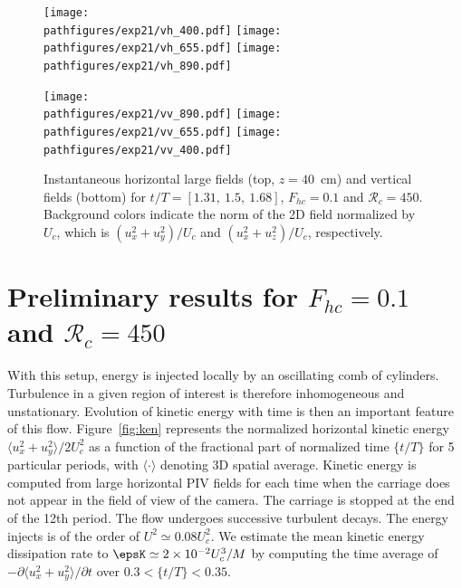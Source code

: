\begin{figure}[htb]
\centerline{
\texttt{[image: \\pathfigures/exp21/vh\_400.pdf]}
\texttt{[image: \\pathfigures/exp21/vh\_655.pdf]}
\texttt{[image: \\pathfigures/exp21/vh\_890.pdf]}}
\vspace{0mm}
\centerline{
\texttt{[image: \\pathfigures/exp21/vv\_890.pdf]}
\texttt{[image: \\pathfigures/exp21/vv\_655.pdf]}
\texttt{[image: \\pathfigures/exp21/vv\_400.pdf]}
}
\vspace{-2mm}
\caption{Instantaneous horizontal large fields (top, $z=40$~cm) and vertical
fields (bottom) for $t/T = [1.31,~1.5,~1.68]$, $F_{hc} = 0.1$ and
$\mathcal{R}_c=450$. Background colors indicate the norm of the 2D field
normalized by $U_c$, which is $(u_x^2 + u_y^2)/U_c$ and $(u_x^2 + u_z^2)/U_c$,
respectively.}
\label{fig:field}
\end{figure}


\section{Preliminary results for $F_{hc} = 0.1$ and $\mathcal{R}_c=450$}

With this setup, energy is injected locally by an oscillating comb of
cylinders. Turbulence in a given region of interest is therefore inhomogeneous
and unstationary. Evolution of kinetic energy with time is then an important
feature of this flow. Figure~\ref{fig:ken} represents the normalized horizontal
kinetic energy $\langle u_x^2 + u_y^2 \rangle/2U_c^2$ as a function of the
fractional part of normalized time $\{t/T\}$ for 5 particular periods, with
$\langle\cdot\rangle$ denoting 3D spatial average. Kinetic energy is computed
from large horizontal PIV fields for each time when the carriage does not
appear in the field of view of the camera. The carriage is stopped at the end
of the 12th period. The flow undergoes successive turbulent decays. The energy
injects is of the order of $U^2 \simeq 0.08 U_c^2$.
%
We estimate the mean kinetic energy dissipation rate to
$\epsK \simeq 2 \times 10^{-2} U_c^3/M$ by computing the time average of
$-\partial\langle u_x^2+u_y^2\rangle/\partial t$ over $0.3 < \{t/T\} < 0.35$.


